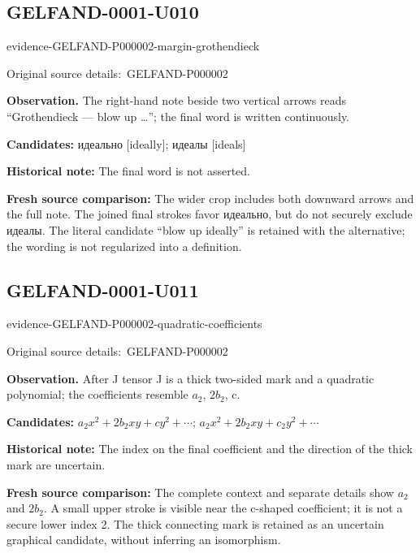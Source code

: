 \documentclass[11pt]{article}
\newcommand{\EvidenceBlock}[4]{%
 \par\smallskip\noindent\begin{minipage}{\linewidth}
 \begin{minipage}[t]{.47\linewidth}\vspace{0pt}\centering
 \csname evidence-#1-#2\endcsname\par
 {\scriptsize\SourceCropCaption\ #1}\par
 \end{minipage}\hfill
 \begin{minipage}[t]{.49\linewidth}\vspace{0pt}\raggedright
 {\small\color{orange!65!black}\textbf{#4} #3}\par
 \end{minipage}
 \end{minipage}\par\smallskip}
\newcommand{\SourceCropCaption}{Original source details:}\newcommand{\ReadingCaption}{Uncertain reading.}\newcommand{\IncompleteCaption}{Undeciphered passage.}\newcommand{\DiagramCaption}{Diagram and typed description.}
\begin{document}
\subsection*{GELFAND-0001-U010}
\EvidenceBlock{GELFAND-P000002}{margin-grothendieck}{The right-hand note beside two vertical arrows reads “Grothendieck — blow up …”; the final word is written continuously.}{Observation.}
\par\smallskip\noindent\textbf{Candidates: } идеально [ideally]; идеалы [ideals]\par
\par\smallskip\noindent\textbf{Historical note: } The final word is not asserted.\par
\par\smallskip\noindent\textbf{Fresh source comparison: } The wider crop includes both downward arrows and the full note. The joined final strokes favor идеально, but do not securely exclude идеалы. The literal candidate “blow up ideally” is retained with the alternative; the wording is not regularized into a definition.\par

\subsection*{GELFAND-0001-U011}
\EvidenceBlock{GELFAND-P000002}{quadratic-coefficients}{After J tensor J is a thick two-sided mark and a quadratic polynomial; the coefficients resemble \(a_2\), \(2b_2\), c.}{Observation.}
\par\smallskip\noindent\textbf{Candidates: } \(a_2x^2+2b_2xy+cy^2+\cdots\); \(a_2x^2+2b_2xy+c_2y^2+\cdots\)\par
\par\smallskip\noindent\textbf{Historical note: } The index on the final coefficient and the direction of the thick mark are uncertain.\par
\par\smallskip\noindent\textbf{Fresh source comparison: } The complete context and separate details show \(a_2\) and \(2b_2\). A small upper stroke is visible near the c-shaped coefficient; it is not a secure lower index 2. The thick connecting mark is retained as an uncertain graphical candidate, without inferring an isomorphism.\par
\end{document}

